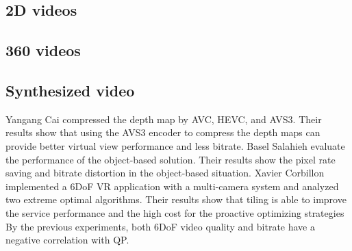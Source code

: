 \subsection{2D videos}

\subsection{360 videos}

\subsection{Synthesized video}
Yangang Cai \cite{CWQP+21} compressed the depth map by AVC, HEVC, and AVS3. Their results show that using the AVS3 encoder to compress the depth maps can provide better virtual view performance and less bitrate.
Basel Salahieh \cite{SCB21} evaluate the performance of the object-based solution. Their results show the pixel rate saving and bitrate distortion in the object-based situation.
Xavier Corbillon \cite{CDSF18} implemented a 6DoF VR application with a multi-camera system and analyzed two extreme optimal algorithms. Their results show that tiling is able to improve the service performance and the high cost for the proactive optimizing strategies
By the previous experiments, both 6DoF video quality and bitrate have a negative correlation with QP.